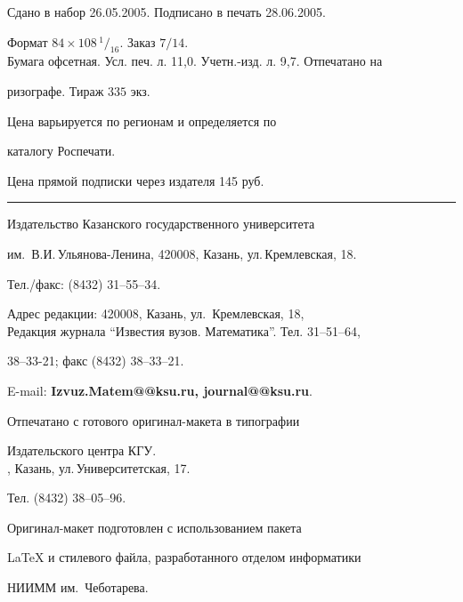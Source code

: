 \noindent Сдано в набор 26.05.2005. Подписано в печать 28.06.2005.


Формат $84\times 108 \,^1/_{16}.$ Заказ $7/14$.\\


Бумага офсетная. Усл. печ. л. 11,0. Учетн.-изд. л. 9,7. Отпечатано на 


ризографе. Тираж $335$ экз. 





\noindent Цена варьируется по регионам и определяется по 


каталогу Роспечати. 





\noindent Цена прямой подписки через издателя 145 руб. 


\bigskip


\hrule


\bigskip


\noindent Издательство Казанского государственного университета


им.~В.И.\,Ульянова-Ленина, 420008, Казань, ул.\,Кремлевская, 18.


Тел./факс: (8432) 31--55--34.\\


\smallskip





\noindent Адрес редакции: 420008, Казань, ул.~Кремлевская, 18,\\  


Редакция журнала  ``Известия вузов. Математика''. Тел. 31--51--64,


38--33-21; факс (8432) 38--33--21.





\noindent E-mail: {\bf Izvuz.Matem@@ksu.ru, journal@@ksu.ru}. \par


\bigskip 


\noindent Отпечатано с готового оригинал-макета в типографии


Издательского центра КГУ. \\





, Казань, ул.\,Университетская, 17.


Тел. (8432) 38--05--96. \par


\bigskip


\noindent Оригинал-макет подготовлен с использованием пакета


\AmS\LaTeX{} и стилевого файла, разработанного отделом информатики


НИИММ им.~Чеботарева.








